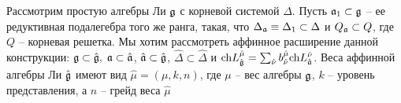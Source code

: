 Рассмотрим простую алгебры Ли $\mathfrak{g}$ с корневой системой $\Delta$. Пусть
$\mathfrak{a}_{1}\subset \mathfrak{g}$ --  ее редуктивная подалегебра того же ранга, такая, что
$\Delta_{\mathfrak{a}}\equiv\Delta_{1}\subset\Delta$ и $Q_{\mathfrak{a}}\subset Q$, где $Q$ -- корневая решетка. Мы хотим рассмотреть аффинное расширение данной конструкции:
$\mathfrak{g}\subset\hat{\mathfrak{g}},\; \mathfrak{a}\subset\hat{\mathfrak{a}}$, $\hat{\mathfrak{a}}\subset\hat{\mathfrak{g}}$,
$\hat{\Delta}\subset\hat{\Delta}$ и
$\mathrm{ch}L^{\hat{\mu}}_{\hat{\mathfrak{g}}}=\sum_{\hat{\nu}}
b^{\hat{\mu}}_{\hat{\nu}} \mathrm{ch} L^{\hat{\nu}}_{\hat{\mathfrak{a}}}$. Веса аффинной алгебры Ли $\hat{\mathfrak{g}}$ имеют вид
$\hat{\mu}=(\mu,k,n)$, где $\mu$ -- вес алгебры $\mathfrak{g}$, $k$ -- уровень представления, а  $n$ -- грейд веса
$\hat{\mu}$


